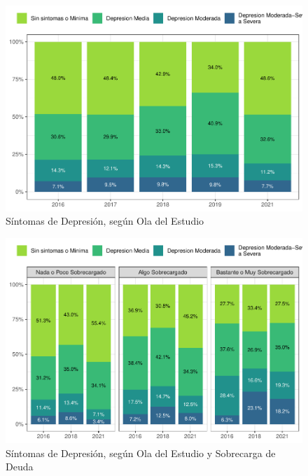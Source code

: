 \documentclass[
  12pt,
  openany]{book}
\begin{document}
\begin{figure}

{\centering \includegraphics{reporte-elsoc_files/figure-latex/depre-wave-1} 

}

\caption{Síntomas de Depresión, según Ola del Estudio}\label{fig:depre-wave}
\end{figure}

\begin{figure}

{\centering \includegraphics{reporte-elsoc_files/figure-latex/depre-deuda-wave-1} 

}

\caption{Síntomas de Depresión, según Ola del Estudio y Sobrecarga de Deuda}\label{fig:depre-deuda-wave}
\end{figure}
\end{document}
